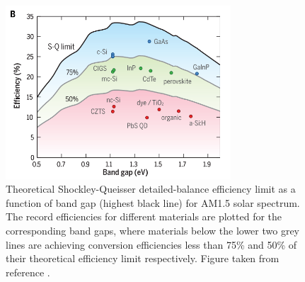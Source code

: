 \documentclass[11pt, twoside]{report}
\begin{document}
\begin{figure}[h!]
  \centering
    \includegraphics[width=0.75\textwidth]{figures/SQ_new.png}
    \caption[Theoretical Shockley-Queisser detailed-balance efficiency limit as a function of band gap (highest black line) for AM1.5 solar spectrum. The record efficiencies for different materials are plotted for the corresponding band gaps, where materials below the lower two grey lines are achieving conversion efficiencies less than 75\% and 50\% of their theoretical efficiency limit respectively.]{Theoretical Shockley-Queisser detailed-balance efficiency limit \cite{SQ_1961} as a function of band gap (highest black line) for AM1.5 solar spectrum. The record efficiencies for different materials are plotted for the corresponding band gaps, where materials below the lower two grey lines are achieving conversion efficiencies less than 75\% and 50\% of their theoretical efficiency limit respectively. Figure taken from reference .}
  \label{SQ}
\end{figure}
\end{document}
